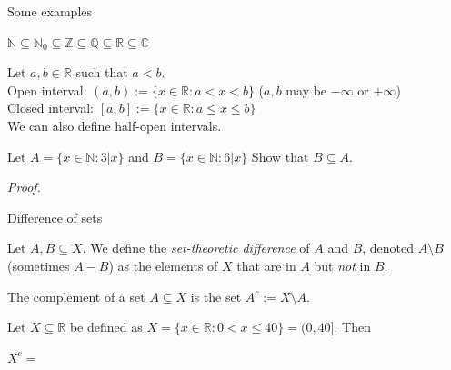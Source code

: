 \documentclass [aspectratio=169, handout]{beamer}
\newcommand{\R}{{\mathbb{R}}}
\newcommand{\N}{{\mathbb{N}}}
\begin{document}
\begin{frame}{Some examples}

\begin{example}
$\mathbb{N} \subseteq \mathbb{N}_0 \subseteq \mathbb{Z} \subseteq \mathbb{Q} \subseteq \mathbb{R} \subseteq \mathbb{C}$
\end{example}

\vspace{1em}

\begin{example}  Let $a, b \in \R$ such that $a < b$. \\
Open interval: $(a,b) := \{x \in \R : a < x < b \}$  ($a,b$ may be $- \infty$ or $+ \infty$)\\
Closed interval: $[a,b] := \{x \in \R : a \leq x \leq b \}$ \\
We can also define half-open intervals. 
\end{example}

\end{frame}


\begin{frame}
\begin{example}
Let $A = \{x \in \N: 3 | x \}$ and $B = \{x \in \N: 6 | x \}$
Show that $B \subseteq A$. 
\end{example}
\textit{Proof.}
\vspace{7em}
\end{frame}

\begin{frame}{Difference of sets}
\begin{definition}
Let $A,B \subseteq X$. We define the \emph{set-theoretic difference} of $A$ and $B$, denoted $A \setminus B$ (sometimes $A-B$) as the elements of $X$ that are in $A$ but \emph{not} in $B$. 

The complement of a set $A \subseteq X$ is the set $A^c := X \setminus A$.
\end{definition}

\vspace{1em}

\begin{example}
Let $X\subseteq\R$ be defined as $X = \{x \in \R: 0 < x \leq 40 \} = (0,40]$. Then 

\vspace{0.5em}
$X^c=$%
\vspace{3em}
\end{example}

\end{frame}
\end{document}
